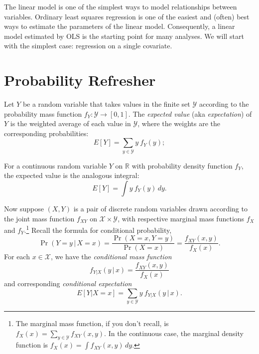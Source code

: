\documentclass[
  12pt,
  oneside,openany]{book}
\begin{document}
The linear model is one of the simplest ways to model relationships between variables. Ordinary least squares regression is one of the easiest and (often) best ways to estimate the parameters of the linear model. Consequently, a linear model estimated by OLS is the starting point for many analyses. We will start with the simplest case: regression on a single covariate.

\hypertarget{probability-refresher}{%
\section{Probability Refresher}\label{probability-refresher}}

Let \(Y\) be a random variable that takes values in the finite set \(\mathcal{Y}\) according to the probability mass function \(f_Y : \mathcal{Y} \to [0, 1]\). The \emph{expected value} (aka \emph{expectation}) of \(Y\) is the weighted average of each value in \(\mathcal{Y}\), where the weights are the corresponding probabilities:
\begin{equation}
E[Y] = \sum_{y \in \mathcal{Y}} y \: f_Y(y);
\end{equation}

For a continuous random variable \(Y\) on \(\mathbb{R}\) with probability density function \(f_Y\), the expected value is the analogous integral:
\begin{equation}
E[Y] = \int y \: f_Y(y) \, dy.
\end{equation}

Now suppose \((X, Y)\) is a pair of discrete random variables drawn according to the joint mass function \(f_{XY}\) on \(\mathcal{X} \times \mathcal{Y}\), with respective marginal mass functions \(f_X\) and \(f_Y\).\footnote{The marginal mass function, if you don't recall, is \(f_X(x) = \sum_{y \in \mathcal{Y}} f_{XY} (x, y)\). In the continuous case, the marginal density function is \(f_X(x) = \int f_{XY} (x, y) \, dy\).} Recall the formula for conditional probability,
\begin{equation}
\Pr(Y = y \,|\, X = x)
= \frac{\Pr(X = x, Y = y)}{\Pr(X = x)}
= \frac{f_{XY}(x, y)}{f_X(x)}.
\end{equation}
For each \(x \in \mathcal{X}\), we have the \emph{conditional mass function}
\begin{equation}
f_{Y|X}(y \,|\, x) = \frac{f_{XY}(x, y)}{f_X(x)}
\end{equation}
and corresponding \emph{conditional expectation}
\begin{equation}
E[Y | X = x]
= \sum_{y \in \mathcal{Y}} y \: f_{Y|X}(y \,|\, x).
\end{equation}
\end{document}
